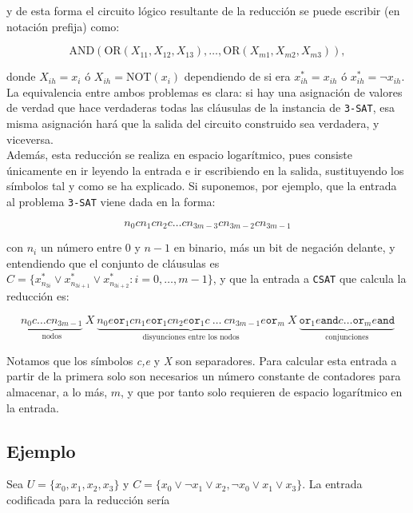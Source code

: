 \documentclass[11pt,a4paper]{article}
\newenvironment{sol}{\begin{adjustwidth}{1em}{}}{\end{adjustwidth}}
\begin{document}
\begin{sol}
y de esta forma el circuito lógico resultante de la reducción se puede escribir (en notación prefija) como:

\[
\text{AND}(\text{OR}(X_{11},X_{12},X_{13}), \dots, \text{OR}(X_{m1}, X_{m2}, X_{m3})),
\]

donde $X_{ih} = x_i$ ó $X_{ih} = \text{NOT}(x_i)$ dependiendo de si era $x^*_{ih} = x_{ih}$ ó $x_{ih}^* = \lnot x_{ih}$.\\

La equivalencia entre ambos problemas es clara: si hay una asignación de valores de verdad que hace verdaderas todas las cláusulas de la instancia de \verb|3-SAT|, esa misma asignación hará que la salida del circuito construido sea verdadera, y viceversa.\\

Además, esta reducción se realiza en espacio logarítmico, pues consiste únicamente en ir leyendo la entrada e ir escribiendo en la salida, sustituyendo los símbolos tal y como se ha explicado. Si suponemos, por ejemplo, que la entrada al problema \verb|3-SAT| viene dada en la forma:

\[
  n_{0} c n_{1} c n_{2} c \dots c n_{3m-3} c n_{3m-2} c n_{3m-1}
\]

con $n_{i}$ un número entre 0 y $n-1$ en binario, más un bit de negación delante, y entendiendo que el conjunto de cláusulas es $C = \{ x^*_{n_{3i}}\lor x^*_{n_{3i+1}} \lor x^*_{n_{3i+2}} : i=0,\dots,m-1 \}$, y que la entrada a \verb|CSAT| que calcula la reducción es:

\[
  \underbrace{n_{0}c\dots cn_{3m-1}}_\text{nodos}\ X\ \underbrace{n_{0}e\texttt{or}_{1}cn_{1}e\texttt{or}_{1}cn_{2}e\texttt{or}_{1}c\ \dots\ cn_{3m-1}e\texttt{or}_{m}}_\text{disyunciones entre los nodos}\ X \ \underbrace{\texttt{or}_{1}e\texttt{and}c\dots \texttt{or}_{m}e\texttt{and}}_\text{conjunciones}
\]

Notamos que los símbolos \textit{c,e} y \textit{X} son separadores. Para calcular esta entrada a partir de la primera solo son necesarios un número constante de contadores para almacenar, a lo más, $m$, y que por tanto solo requieren de espacio logarítmico en la entrada.

\subsection*{Ejemplo}

Sea $U = \{x_0,x_1,x_2,x_3\}$ y $C = \{ x_0 \lor \lnot x_1 \lor x_2, \lnot x_0 \lor x_1 \lor x_3 \}$. La entrada codificada para la reducción sería


\end{sol}
\end{document}
